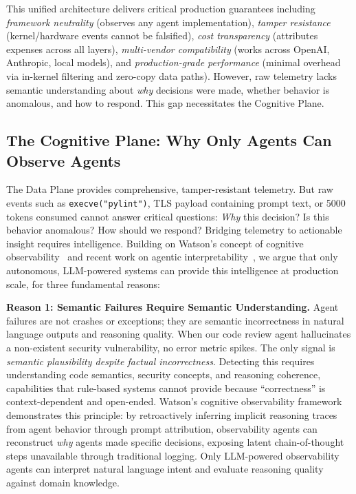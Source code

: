 \documentclass[sigplan,screen,9pt]{acmart}
\begin{document}
This unified architecture delivers critical production guarantees including \emph{framework neutrality} (observes any agent implementation), \emph{tamper resistance} (kernel/hardware events cannot be falsified), \emph{cost transparency} (attributes expenses across all layers), \emph{multi-vendor compatibility} (works across OpenAI, Anthropic, local models), and \emph{production-grade performance} (minimal overhead via in-kernel filtering and zero-copy data paths). However, raw telemetry lacks semantic understanding about \emph{why} decisions were made, whether behavior is anomalous, and how to respond. This gap necessitates the Cognitive Plane.

\subsection{The Cognitive Plane: Why Only Agents Can Observe Agents}

The Data Plane provides comprehensive, tamper-resistant telemetry. But raw events such as \texttt{execve("pylint")}, TLS payload containing prompt text, or 5000 tokens consumed cannot answer critical questions: \emph{Why} this decision? Is this behavior anomalous? How should we respond? Bridging telemetry to actionable insight requires intelligence. Building on Watson's concept of cognitive observability~\cite{Rombaut2025Watson} and recent work on agentic interpretability~\cite{Kim2025AgenticInterp}, we argue that only autonomous, LLM-powered systems can provide this intelligence at production scale, for three fundamental reasons:

\textbf{Reason 1: Semantic Failures Require Semantic Understanding.} Agent failures are not crashes or exceptions; they are semantic incorrectness in natural language outputs and reasoning quality. When our code review agent hallucinates a non-existent security vulnerability, no error metric spikes. The only signal is \emph{semantic plausibility despite factual incorrectness}. Detecting this requires understanding code semantics, security concepts, and reasoning coherence, capabilities that rule-based systems cannot provide because ``correctness'' is context-dependent and open-ended. Watson's cognitive observability framework~\cite{Rombaut2025Watson} demonstrates this principle: by retroactively inferring implicit reasoning traces from agent behavior through prompt attribution, observability agents can reconstruct \emph{why} agents made specific decisions, exposing latent chain-of-thought steps unavailable through traditional logging. Only LLM-powered observability agents can interpret natural language intent and evaluate reasoning quality against domain knowledge.
\end{document}
